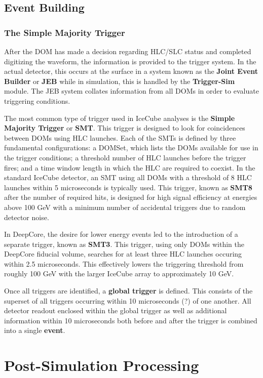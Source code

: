 \subsection{Event Building}
\subsubsection{The Simple Majority Trigger}
After the DOM has made a decision regarding HLC/SLC status and completed digitizing the waveform, the information is provided to the trigger system.
In the actual detector, this occurs at the surface in a system known as the \textbf{Joint Event Builder} or \textbf{JEB} while in simulation, this is handled by the \textbf{Trigger-Sim} module. 
The JEB system collates information from all DOMs in order to evaluate triggering conditions.

The most common type of trigger used in IceCube analyses is the \textbf{Simple Majority Trigger} or \textbf{SMT}. 
This trigger is designed to look for coincidences between DOMs using HLC launches.
Each of the SMTs is defined by three fundamental configurations: a DOMSet, which lists the DOMs available for use in the trigger conditions; a threshold number of HLC launches before the trigger fires; and a time window length in which the HLC are required to coexist.
In the standard IceCube detector, an SMT using all DOMs with a threshold of 8 HLC launches within 5 microseconds is typically used.
This trigger, known as \textbf{SMT8} after the number of required hits, is designed for high signal efficiency at energies above 100 GeV with a minimum number of accidental triggers due to random detector noise.

In DeepCore, the desire for lower energy events led to the introduction of a separate trigger, known as \textbf{SMT3}.
This trigger, using only DOMs within the DeepCore fiducial volume, searches for at least three HLC launches occuring within 2.5 microseconds.
This effectively lowers the triggering threshold from roughly 100 GeV with the larger IceCube array to approximately 10 GeV.

Once all triggers are identified, a \textbf{global trigger} is defined. 
This consists of the superset of all triggers occurring within 10 microseconds (?) of one another.
All detector readout enclosed within the global trigger as well as additional information within 10 microseconds both before and after the trigger is combined into a single \textbf{event}.

\section{Post-Simulation Processing}
